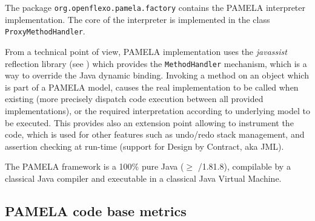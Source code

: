 The package \texttt{org.openflexo.pamela.factory} contains the PAMELA interpreter implementation. The core of the interpreter is implemented in the class \texttt{ProxyMethodHandler}.

From a technical point of view, PAMELA implementation uses the \emph{javassist} reflection library (see \cite{shigueru2000}) which provides the \texttt{MethodHandler} mechanism, which is a way to override the Java dynamic binding. Invoking a method on an object which is part of a PAMELA model, causes the real implementation to be called when existing (more precisely dispatch code execution between all provided implementations), or the required interpretation according to underlying model to be executed. This provides also an extension point allowing to instrument the code, which is used for other features such as undo/redo stack management, and assertion checking at run-time (support for Design by Contract, aka JML).

The PAMELA framework is a 100\% pure Java ($\geq$ /1.81.8), compilable by a classical Java compiler and executable in a classical Java Virtual Machine.

\subsection{PAMELA code base metrics}


